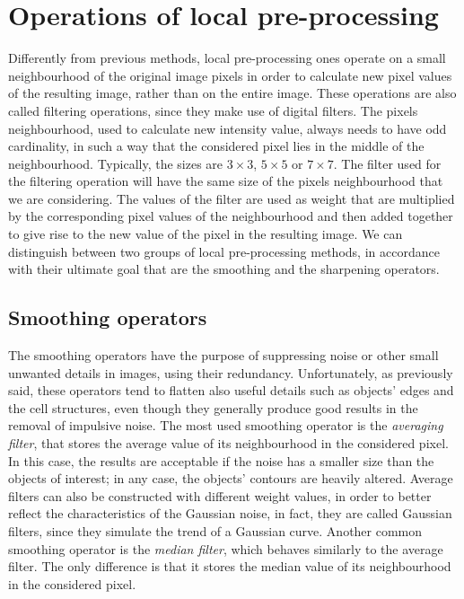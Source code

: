 \documentclass[final,a4paper,12pt,english]{UnicaPhdThesis3}
\begin{document}
\section{Operations of local pre-processing} %
Differently from previous methods, local pre-processing ones operate on a small neighbourhood of the original image pixels in order to calculate new pixel values ​​of the resulting image, rather than on the entire image. These operations are also called filtering operations, since they make use of digital filters. The pixels neighbourhood, used to calculate new intensity value, always needs to have odd cardinality, in such a way that the considered pixel lies in the middle of the neighbourhood. Typically, the sizes are $3\times3$, $5\times5$ or $7\times7$. The filter used for the filtering operation will have the same size of the pixels neighbourhood that we are considering. The values of the filter are used as weight that are multiplied by the corresponding pixel values of the neighbourhood and then added together to give rise to the new value of the pixel in the resulting image. We can distinguish between two groups of local pre-processing methods, in accordance with their ultimate goal that are the smoothing and the sharpening operators.

\subsection{Smoothing operators} %
The smoothing operators have the purpose of suppressing noise or other small unwanted details in images, using their redundancy. Unfortunately, as previously said, these operators tend to flatten also useful details such as objects' edges and the cell structures, even though they generally produce good results in the removal of impulsive noise. The most used smoothing operator is the \textit{averaging filter}, that stores the average value of its neighbourhood in the considered pixel. In this case, the results are acceptable if the noise has a smaller size than the objects of interest; in any case, the objects' contours are heavily altered. Average filters can also be constructed with different weight values, in order to better reflect the characteristics of the Gaussian noise, in fact, they are called Gaussian filters, since they simulate the trend of a Gaussian curve. Another common smoothing operator is the \textit{median filter}, which behaves similarly to the average filter. The only difference is that it stores the median value of its neighbourhood in the considered pixel.
\end{document}

